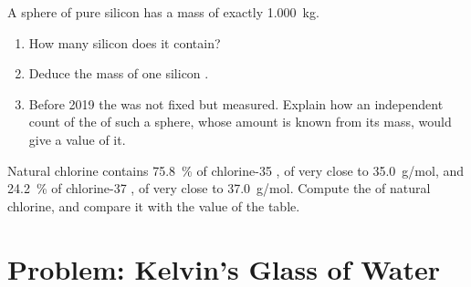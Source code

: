 \begin{exercise}[$\star\star\star$]\label{exo:g10:the-mole:14}
A sphere of pure silicon has a mass of exactly \qty{1.000}{kg}.
\begin{enumerate}
  \item How many silicon  does it contain?
  \item Deduce the mass of one silicon .
  \item Before 2019 the  was not fixed but measured.
        Explain how an independent count of the  of such a sphere,
        whose amount is known from its mass, would give a value of it.
\end{enumerate}
\end{exercise}

\begin{exercise}[$\star\star\star$]\label{exo:g10:the-mole:15}
Natural chlorine contains \qty{75.8}{\percent} of chlorine-35 , of
 very close to \qty{35.0}{g/mol}, and \qty{24.2}{\percent} of
chlorine-37 , of  very close to \qty{37.0}{g/mol}.
Compute the  of natural chlorine, and compare it with
the value of the table.
\end{exercise}

\section{Problem: Kelvin's Glass of Water}

